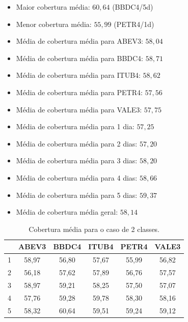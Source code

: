 \documentclass[grad,numbers]{coppe}
\begin{document}
				\begin{itemize}
	 				\item Maior cobertura média: $60,64$ (BBDC4/5d)
	 				\item Menor cobertura média: $55,99$ (PETR4/1d)
	 				\item Média de cobertura média para ABEV3: $58,04$
	 				\item Média de cobertura média para BBDC4: $58,71$
	 				\item Média de cobertura média para ITUB4: $58,62$
	 				\item Média de cobertura média para PETR4: $57,56$
	 				\item Média de cobertura média para VALE3: $57,75$
	 				\item Média de cobertura média para 1 dia: $57,25$
	 				\item Média de cobertura média para 2 dias: $57,20$
	 				\item Média de cobertura média para 3 dias: $58,20$
	 				\item Média de cobertura média para 4 dias: $58,66$
	 				\item Média de cobertura média para 5 dias: $59,37$
	 				\item Média de cobertura média geral: $58,14$
	 			\end{itemize}
	 			\begin{table}[h]
		 				\caption{Cobertura média para o caso de 2 classes.}
		 				\label{tab:2c_co_analysis}
		 				\centering
		 				{\footnotesize
		 					\begin{tabular}{|c|c|c|c|c|c|}
		 						\hline
		 						\diagbox[linewidth=0.2pt, width=\dimexpr \textwidth/10+2\tabcolsep\relax, height=0.8cm]{Dias}{Ativo}
		 						& ABEV3 & BBDC4 & ITUB4 & PETR4 & VALE3\\
		 						\hline
		 						1 & 58,97 & 56,80 & 57,67 & 55,99 & 56,82 \\
		 						2 & 56,18 & 57,62 & 57,89 & 56,76 & 57,57 \\
		 						3 & 58,97 & 59,21 & 58,25 & 57,50 & 57,07 \\
		 						4 & 57,76 & 59,28 & 59,78 & 58,30 & 58,16 \\
		 						5 & 58,32 & 60,64 & 59,51 & 59,24 & 59,12 \\
		 						\hline
		 				\end{tabular}}
		 			\end{table}
\end{document}
